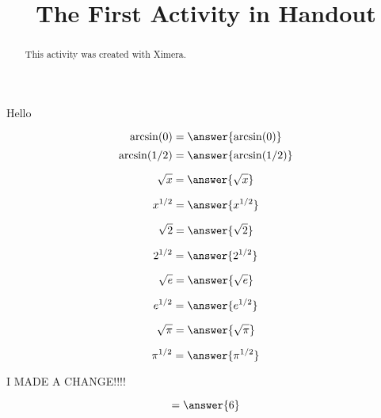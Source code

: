 \documentclass{ximera}
\title{The First Activity in Handout}
\begin{document}
  
\begin{abstract}  
This activity was created with Ximera.
\end{abstract}  
\maketitle

\begin{example}

Hello

  \[
  \arcsin(0) = \answer{\arcsin(0)}
  \]
  \[
  \arcsin(1/2) = \answer{\arcsin(1/2)}
  \]



  
\[
\sqrt{x} = \answer{\sqrt{x}}
\]

\[
x^{1/2} = \answer{x^{1/2}}
\]

\[
\sqrt{2} = \answer{\sqrt{2}}
\]

\[
2^{1/2} = \answer{2^{1/2}}
\] 

\[
\sqrt{e} = \answer{\sqrt{e}}
\]


\[
e^{1/2} = \answer{e^{1/2}}
\] 




\[
\sqrt{\pi} = \answer{\sqrt{\pi}}
\]


\[
\pi^{1/2} = \answer{\pi^{1/2}}
\] 
\end{example}
I MADE A CHANGE!!!!


\begin{problem}  
  \begin{prompt}
    \[
    = \answer{6}
    \]
  \end{prompt}
\end{problem}
\end{document}
